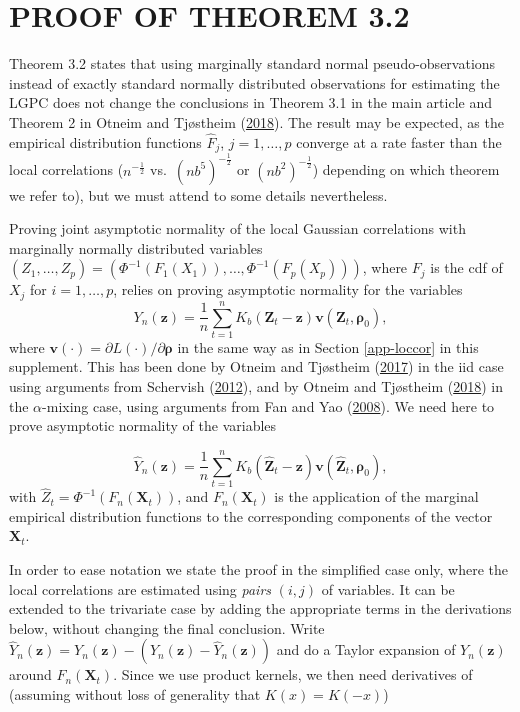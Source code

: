 \documentclass[
  12pt,
  letterpaper]{article}
\numberwithin{equation}{section}
\newcommand{\X}{\bm{X}}
\newcommand{\Z}{\bm{Z}}
\newcommand{\z}{\bm{z}}
\newcommand{\hZ}{\widehat{\bm{Z}}}
\newcommand{\hnZ}{\widehat{Z}}
\newcommand{\hY}{\widehat{Y}}
\newcommand{\fv}{\bm{v}}
\newcommand{\frho}{\bm{\rho}}
\begin{document}
\hypertarget{proofpseudo}{%
\section{PROOF OF THEOREM 3.2}\label{proofpseudo}}

Theorem 3.2 states that using marginally standard normal pseudo-observations instead of exactly standard normally distributed observations for estimating the LGPC does not change the conclusions in Theorem 3.1 in the main article and Theorem 2 in Otneim and Tjøstheim (\protect\hyperlink{ref-otneim2017conditional}{2018}). The result may be expected, as the empirical distribution functions \(\widehat{F}_j\), \(j = 1,\ldots,p\) converge at a rate faster than the local correlations (\(n^{-\frac{1}{2}}\) vs.~\((nb^5)^{-\frac{1}{2}}\) or \((nb^2)^{-\frac{1}{2}}\)) depending on which theorem we refer to), but we must attend to some details nevertheless.

Proving joint asymptotic normality of the local Gaussian correlations with marginally normally distributed variables \((Z_1, \ldots, Z_p) = \left(\Phi^{-1}(F_1(X_1)), \ldots, \Phi^{-1}(F_p(X_p))\right)\), where \(F_j\) is the cdf of \(X_j\) for \(i = 1,\ldots,p\), relies on proving asymptotic normality for the variables
\[Y_n(\z) = \frac{1}{n}\sum_{t=1}^nK_b(\Z_t - \z)\fv(\Z_t, \frho_0),\]
where \(\fv(\cdot) = \partial L(\cdot)/\partial\frho\) in the same way as in Section \ref{app-loccor} in this supplement. This has been done by Otneim and Tjøstheim (\protect\hyperlink{ref-otneim2017locally}{2017}) in the iid case using arguments from Schervish (\protect\hyperlink{ref-schervish1995theory}{2012}), and by Otneim and Tjøstheim (\protect\hyperlink{ref-otneim2017conditional}{2018}) in the \(\alpha\)-mixing case, using arguments from Fan and Yao (\protect\hyperlink{ref-fan2008nonlinear}{2008}). We need here to prove asymptotic normality of the variables

\[\hY_n(\z) = \frac{1}{n}\sum_{t=1}^nK_b(\hZ_t - \z)\fv(\hZ_t,\frho_0),\]
with \(\hnZ_t = \Phi^{-1}(F_n(\X_t))\), and \(F_n(\X_t)\) is the application of the marginal empirical distribution functions to the corresponding components of the vector \(\X_t\).

In order to ease notation we state the proof in the simplified case only, where the local correlations are estimated using \emph{pairs} \((i,j)\) of variables. It can be extended to the trivariate case by adding the appropriate terms in the derivations below, without changing the final conclusion. Write \(\hY_n(\z) = Y_n(\z) - (Y_n(\z) - \hY_n(\z))\) and do a Taylor expansion of \(Y_n(\z)\) around \(F_n(\X_t)\). Since we use product kernels, we then need derivatives of (assuming without loss of generality that \(K(x) = K(-x)\))
\end{document}
